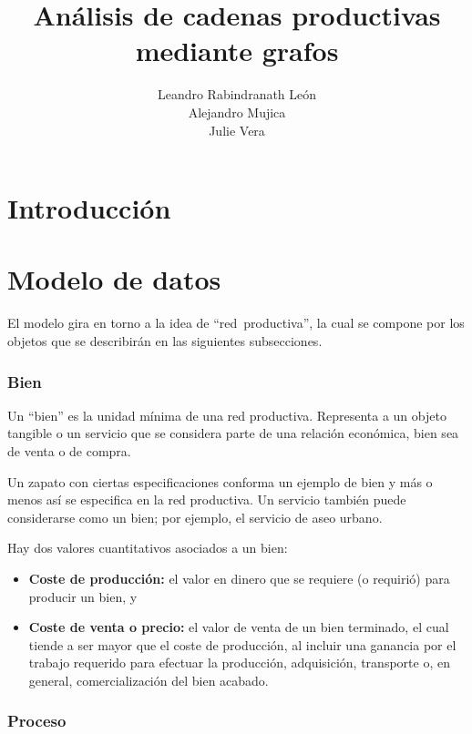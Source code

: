 \documentclass[11pt,spanish,letter]{article}
\title{Análisis de cadenas productivas mediante grafos}
\author{Leandro Rabindranath León \\ Alejandro Mujica \\ Julie Vera}
\begin{document}
 \maketitle
 
 \tableofcontents

 \section{Introducción}


 \section{Modelo de datos}

 El modelo gira en torno a la idea de ``red~productiva'', la cual se
 compone por los objetos que se describirán en las siguientes
 subsecciones.

   \subsubsection{Bien}

   Un ``bien'' es la unidad mínima de una red productiva. Representa a un
   objeto tangible o un servicio que se considera parte de una relación
   económica, bien sea de venta o de compra.

   Un zapato con ciertas especificaciones conforma un ejemplo de bien y
   más o menos así se especifica en la red productiva. Un servicio
   también puede considerarse como un bien; por ejemplo, el servicio de
   aseo urbano.

   Hay dos valores cuantitativos asociados a un bien:
   \begin{itemize}
    \item {\bf Coste de producción:} el valor en dinero que se requiere
	  (o requirió) para producir un bien, y

    \item {\bf Coste de venta o precio:} el valor de venta de un bien
	  terminado, el cual tiende a ser mayor que el coste de
	  producción, al incluir una ganancia  por el trabajo
	  requerido para efectuar la producción, adquisición, transporte o,
	  en general, comercialización del bien acabado.
   \end{itemize}


   \subsubsection{Proceso}
\end{document}
